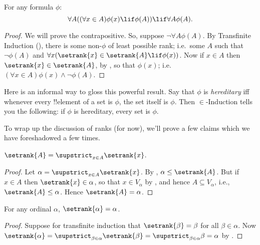 \documentclass[../../../include/open-logic-section]{subfiles}
\begin{document}
\begin{thm} 
For any formula $\phi$:
\[
	\forall A((\forall x \in A)\phi(x) \lif \phi(A)) \lif \forall A \phi(A).
\]
\end{thm}

\begin{proof}
We will prove the contrapositive. So, suppose $\lnot \forall A
\phi(A)$. By Transfinite Induction
(), there
is some non-$\phi$ of least possible rank; i.e.\ some $A$
such that $\lnot \phi(A)$ and $\forall x(\setrank{x} \in \setrank{A}
\lif \phi(x))$. Now if $x \in A$ then $\setrank{x} \in
\setrank{A}$, by , so that $\phi(x)$; i.e.\ $(\forall x \in
A)\phi(x) \land \lnot \phi(A)$.
\end{proof}\noindent Here is an informal way to gloss this powerful
result. Say that $\phi$ is \emph{hereditary} iff whenever every
!!{element} of a set is $\phi$, the set itself is $\phi$. Then
$\in$-Induction tells you the following: if $\phi$ is hereditary,
every set is $\phi$.

To wrap up the discussion of ranks (for now), we'll prove a few
claims which we have foreshadowed a few times. 

\begin{prop}
$\setrank{A} = \supstrict_{x \in A}\setrank{x}$.
\end{prop}

\begin{proof}
Let $\alpha = \supstrict_{x \in A}\setrank{x}$. By
, $\alpha \leq \setrank{A}$. But if $x \in A$
then $\setrank{x} \in \alpha$, so that $x \in V_\alpha$ by , and hence $A
\subseteq V_\alpha$, i.e., $\setrank{A} \leq \alpha$. Hence
$\setrank{A} = \alpha$.
\end{proof}

\begin{cor}
For any ordinal $\alpha$, $\setrank{\alpha} = \alpha$.
\end{cor}

\begin{proof}
Suppose for transfinite induction that $\setrank{\beta} = \beta$ for
all $\beta \in \alpha$. Now $\setrank{\alpha} = \supstrict_{\beta \in
\alpha}\setrank{\beta} = \supstrict_{\beta \in \alpha}\beta = \alpha$
by .
%
\end{proof}
\end{document}
